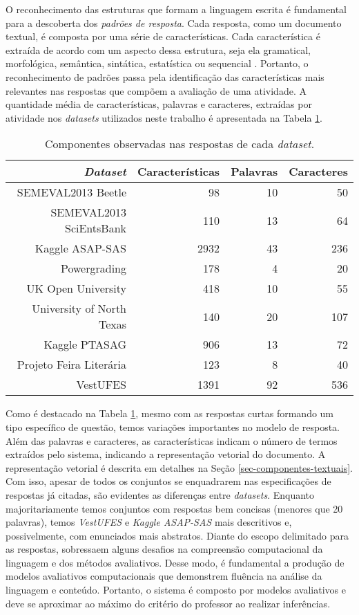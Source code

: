 O reconhecimento das estruturas que formam a linguagem escrita é fundamental para a descoberta dos \textit{padrões de resposta}. Cada resposta, como um documento textual, é composta por uma série de características. Cada característica é extraída de acordo com um aspecto dessa estrutura, seja ela gramatical, morfológica, semântica, sintática, estatística ou sequencial \cite{kumar2019}. Portanto, o reconhecimento de padrões passa pela identificação das características mais relevantes nas respostas que compõem a avaliação de uma atividade. A quantidade média de características, palavras e caracteres, extraídas por atividade nos \textit{datasets} utilizados neste trabalho é apresentada na Tabela \ref{tab-features}.

\begin{table}
\centering
\caption{Componentes observadas nas respostas de cada \textit{dataset}.}
\label{tab-features}
\begin{tabular}{|r | r r r|} \hline
\textit{Dataset} & Características & Palavras & Caracteres \\
\hline
 SEMEVAL2013 Beetle & 98 & 10 & 50 \\
 SEMEVAL2013 SciEntsBank & 110 & 13 & 64 \\
 Kaggle ASAP-SAS & 2932 & 43 & 236 \\
 Powergrading & 178 & 4 & 20 \\
 UK Open University & 418 & 10 & 55 \\
 University of North Texas & 140 & 20 & 107 \\
 Kaggle PTASAG & 906 & 13 & 72 \\
 Projeto Feira Liter{\'a}ria & 123 & 8 & 40 \\
 VestUFES & 1391 & 92 & 536 \\
\hline \hline
\end{tabular}
\end{table}

Como é destacado na Tabela \ref{tab-features}, mesmo com as respostas curtas formando um tipo específico de questão, temos variações importantes no modelo de resposta. Além das palavras e caracteres, as características indicam o número de termos extraídos pelo sistema, indicando a representação vetorial do documento. A representação vetorial é descrita em detalhes na Seção \ref{sec-componentes-textuais}. Com isso, apesar de todos os conjuntos se enquadrarem nas especificações de respostas já citadas, são evidentes as diferenças entre \textit{datasets}. Enquanto majoritariamente temos conjuntos com respostas bem concisas (menores que 20 palavras), temos \textit{VestUFES} e \textit{Kaggle ASAP-SAS} mais descritivos e, possivelmente, com enunciados mais abstratos. Diante do escopo delimitado para as respostas, sobressaem alguns desafios na compreensão computacional da linguagem e dos métodos avaliativos. Desse modo, é fundamental a produção de modelos avaliativos computacionais que demonstrem fluência na análise da linguagem e conteúdo. Portanto, o sistema é composto por modelos avaliativos e deve se aproximar ao máximo do critério do professor ao realizar inferências.

